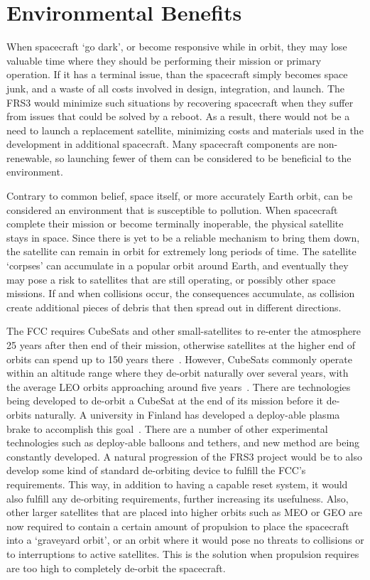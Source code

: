 \documentclass[12pt, twoside]{report}
\begin{document}
\section{Environmental Benefits}
\par When spacecraft `go dark', or become responsive while in orbit, they may lose valuable time where they should be performing their mission or primary operation. If it has a terminal issue, than the spacecraft simply becomes space junk, and a waste of all costs involved in design, integration, and launch.
The FRS3 would minimize such situations by recovering spacecraft when they suffer from issues that could be solved by a reboot. As a result, there would not be a need to launch a replacement satellite, minimizing costs and materials used in the development in additional spacecraft. Many spacecraft components are non-renewable, so launching fewer of them can be considered to be beneficial to the environment.
\par Contrary to common belief, space itself, or more accurately Earth orbit, can be considered an environment that is susceptible to pollution. When spacecraft complete their mission or become terminally inoperable, the physical satellite stays in space. Since there is yet to be a reliable mechanism to bring them down, the satellite can remain in orbit for extremely long periods of time. The satellite `corpses' can accumulate in a popular orbit around Earth, and eventually they may pose a risk to satellites that are still operating, or possibly other space missions. If and when collisions occur, the consequences accumulate, as collision create additional pieces of debris that then spread out in different directions.
\par The FCC requires CubeSats and other small-satellites to re-enter the atmosphere 25 years after then end of their mission, otherwise satellites at the higher end of orbits can spend up to 150 years there~\cite{fccdeorbit}.
However, CubeSats commonly operate within an altitude range where they de-orbit naturally over several years, with the average LEO orbits approaching around five years~\cite{orbitdecay}.
There are technologies being developed to de-orbit a CubeSat at the end of its mission before it de-orbits naturally.
A university in Finland has developed a deploy-able plasma brake to accomplish this goal~\cite{plasmabrake}.
There are a number of other experimental technologies such as deploy-able balloons and tethers, and new method are being constantly developed.
A natural progression of the FRS3 project would be to also develop some kind of standard de-orbiting device to fulfill the FCC's requirements.
This way, in addition to having a capable reset system, it would also fulfill any de-orbiting requirements, further increasing its usefulness.
Also, other larger satellites that are placed into higher orbits such as MEO or GEO are now required to contain a certain amount of propulsion to place the spacecraft into a `graveyard orbit', or an orbit where it would pose no threats to collisions or to interruptions to active satellites.
This is the solution when propulsion requires are too high to completely de-orbit the spacecraft.
\end{document}
